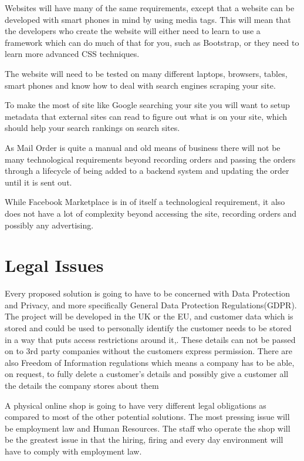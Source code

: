 \documentclass{article}
\begin{document}
 Websites will have many of the same requirements, except that a website can be developed with smart phones in mind by using media tags. This will mean that the developers who create the website will either need to learn to use a framework which can do much of that for you, such as Bootstrap, or they need to learn more advanced CSS techniques. 
 
The website will need to be tested on many different laptops, browsers, tables, smart phones and know how to deal with search engines scraping your site.

To make the most of site like Google searching your site you will want to setup metadata that external sites can read to figure out what is on your site, which should help your search rankings on search sites. 

As Mail Order is quite a manual and old means of business there will not be many technological requirements beyond recording orders and passing the orders through a lifecycle of being added to a backend system and updating the order until it is sent out.

While Facebook Marketplace is in of itself a technological requirement, it also does not have a lot of complexity beyond accessing the site, recording orders and possibly any advertising.


\pagebreak
\section{Legal Issues}
Every proposed solution is going to have to be concerned with Data Protection and Privacy, and more specifically General Data Protection Regulations(GDPR).
The project will be developed in the UK or the EU, and customer data which is stored and could be used to personally identify the customer needs to be stored in a way that puts access restrictions around it,. These details can not be passed on to 3rd party companies without the customers express permission. There are also Freedom of Information regulations which means a company has to be able, on request, to fully delete a customer's details and possibly give a customer all the details the company stores about them

A physical online shop is going to have very different legal obligations as compared to most of the other potential solutions. 
The most pressing issue will be employment law and Human Resources. The staff who operate the shop will be the greatest issue in that the hiring, firing and every day environment will have to comply with employment law.
\end{document}
